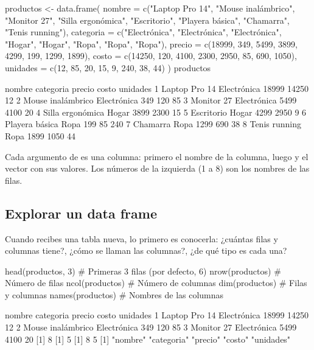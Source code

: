 \begin{rcode}
productos <- data.frame(
  nombre = c("Laptop Pro 14", "Mouse inalámbrico", "Monitor 27",
             "Silla ergonómica", "Escritorio", "Playera básica",
             "Chamarra", "Tenis running"),
  categoria = c("Electrónica", "Electrónica", "Electrónica", "Hogar",
                "Hogar", "Ropa", "Ropa", "Ropa"),
  precio = c(18999, 349, 5499, 3899, 4299, 199, 1299, 1899),
  costo = c(14250, 120, 4100, 2300, 2950, 85, 690, 1050),
  unidades = c(12, 85, 20, 15, 9, 240, 38, 44)
)
productos
\end{rcode}
\begin{rsalida}
             nombre   categoria precio costo unidades
1     Laptop Pro 14 Electrónica  18999 14250       12
2 Mouse inalámbrico Electrónica    349   120       85
3        Monitor 27 Electrónica   5499  4100       20
4  Silla ergonómica       Hogar   3899  2300       15
5        Escritorio       Hogar   4299  2950        9
6    Playera básica        Ropa    199    85      240
7          Chamarra        Ropa   1299   690       38
8     Tenis running        Ropa   1899  1050       44
\end{rsalida}

Cada argumento de  es una columna: primero el nombre
de la columna, luego \codigo{=} y el vector con sus valores. Los números de
la izquierda (1 a 8) son los nombres de las filas.

\subsection{Explorar un data frame}

Cuando recibes una tabla nueva, lo primero es conocerla: ¿cuántas filas y
columnas tiene?, ¿cómo se llaman las columnas?, ¿de qué tipo es cada una?

\begin{rcode}
head(productos, 3)        # Primeras 3 filas (por defecto, 6)
nrow(productos)           # Número de filas
ncol(productos)           # Número de columnas
dim(productos)            # Filas y columnas
names(productos)          # Nombres de las columnas
\end{rcode}
\begin{rsalida}
             nombre   categoria precio costo unidades
1     Laptop Pro 14 Electrónica  18999 14250       12
2 Mouse inalámbrico Electrónica    349   120       85
3        Monitor 27 Electrónica   5499  4100       20
[1] 8
[1] 5
[1] 8 5
[1] "nombre"    "categoria" "precio"    "costo"     "unidades" 
\end{rsalida}


